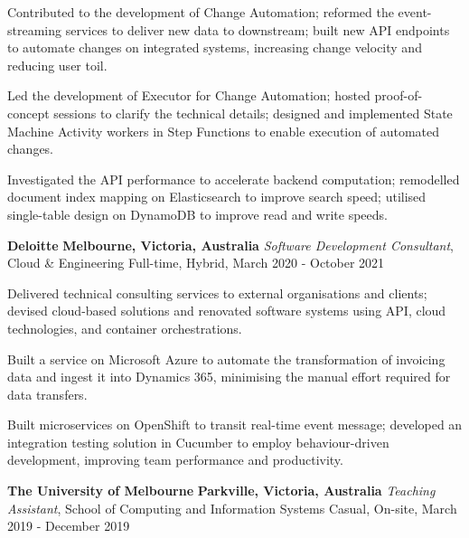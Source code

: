 \documentclass{cv}
\begin{document}
\begin{list}{}{\setlength{\leftmargin}{0pt}}
\begin{list}{\raisebox{2.0pt}{\tiny$\bullet$}\space}{\setlength{\leftmargin}{11.2pt}}
        \item Contributed to the development of Change Automation; reformed the event-streaming services to deliver new data to downstream; built new API endpoints to automate changes on integrated systems, increasing change velocity and reducing user toil.
        \item Led the development of Executor for Change Automation; hosted proof-of-concept sessions to clarify the technical details; designed and implemented State Machine Activity workers in Step Functions to enable execution of automated changes.
        \item Investigated the API performance to accelerate backend computation; remodelled document index mapping on Elasticsearch to improve search speed; utilised single-table design on DynamoDB to improve read and write speeds.
    \end{list}
\item
    \textbf{Deloitte} \hfill \textbf{Melbourne, Victoria, Australia}%
    \vspace{1.0pt} \newline 
    {\textit{Software Development Consultant}, Cloud \& Engineering} \hfill {Full-time, Hybrid, March 2020 - October 2021}%
    \begin{list}{\raisebox{2.0pt}{\tiny$\bullet$}\space}{\setlength{\leftmargin}{11.2pt}}
        \itemsep -5.0pt \vspace{-4.0pt}
        \item Delivered technical consulting services to external organisations and clients; devised cloud-based solutions and renovated software systems using API, cloud technologies, and container orchestrations.
        \item Built a service on Microsoft Azure to automate the transformation of invoicing data and ingest it into Dynamics 365, minimising the manual effort required for data transfers.
        \item Built microservices on OpenShift to transit real-time event message; developed an integration testing solution in Cucumber to employ behaviour-driven development, improving team performance and productivity.
    \end{list}
\item
    \textbf{The University of Melbourne} \hfill \textbf{Parkville, Victoria, Australia}%
    \vspace{1.0pt} \newline 
    {\textit{Teaching Assistant}, School of Computing and Information Systems} \hfill {Casual, On-site, March 2019 - December 2019}%

\end{list}
\end{document}

